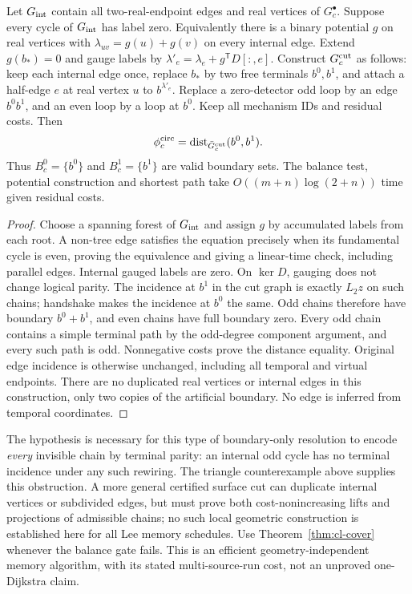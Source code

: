 \begin{theorem}\label{thm:cl-cut}
Let $G_{\rm int}$ contain all two-real-endpoint edges and real vertices of
$G_c^\bullet$. Suppose every cycle of $G_{\rm int}$ has label zero.
Equivalently there is a binary potential $g$ on real vertices with
$\lambda_{uv}=g(u)+g(v)$ on every internal edge. Extend $g(b_*)=0$ and
gauge labels by $\lambda'_e=\lambda_e+g^{\mathsf T}D[:,e]$.
Construct $G_c^{\rm cut}$ as follows: keep each internal edge once, replace
$b_*$ by two free terminals $b^0,b^1$, and attach a half-edge $e$ at
real vertex $u$ to $b^{\lambda'_e}$. Replace a zero-detector odd loop by
an edge $b^0b^1$, and an even loop by a loop at $b^0$. Keep all mechanism
IDs and residual costs. Then
\begin{equation}
 \phi_c^{\rm circ}
 =\operatorname{dist}_{\bar G_c^{\rm cut}}(b^0,b^1).
 \label{eq:cl-cut}
\end{equation}
Thus $B_c^0=\{b^0\}$ and $B_c^1=\{b^1\}$ are valid boundary sets.
The balance test, potential construction and shortest path take
$O((m+n)\log(2+n))$ time given residual costs.
\end{theorem}
\begin{proof}
Choose a spanning forest of $G_{\rm int}$ and assign $g$ by accumulated
labels from each root. A non-tree edge satisfies the equation precisely
when its fundamental cycle is even, proving the equivalence and giving
a linear-time check, including parallel edges. Internal gauged labels
are zero. On $\ker D$, gauging does not change logical parity.
The incidence at $b^1$ in the cut graph is exactly $L_2z$ on such chains;
handshake makes the incidence at $b^0$ the same. Odd chains therefore
have boundary $b^0+b^1$, and even chains have full boundary zero.
Every odd chain contains a simple terminal path by the odd-degree
component argument, and every such path is odd. Nonnegative costs prove
the distance equality. Original edge incidence is otherwise unchanged,
including all temporal and virtual endpoints. There are no duplicated
real vertices or internal edges in this construction, only two copies
of the artificial boundary. No edge is inferred from temporal coordinates.
\end{proof}
The hypothesis is necessary for this type of boundary-only resolution to
encode \emph{every} invisible chain by terminal parity: an internal odd
cycle has no terminal incidence under any such rewiring. The triangle
counterexample above supplies this obstruction. A more general certified
surface cut can duplicate internal vertices or subdivided edges, but must
prove both cost-nonincreasing lifts and projections of admissible chains;
no such local geometric construction is established here for all Lee
memory schedules. Use Theorem~\ref{thm:cl-cover} whenever the balance gate
fails. This is an efficient geometry-independent memory algorithm, with
its stated multi-source-run cost, not an unproved one-Dijkstra claim.

